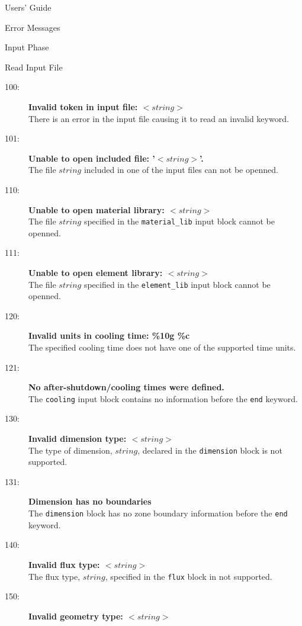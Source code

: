 \begin{chapter}{Users' Guide\label{app:user.guide}}
\begin{section}{Error Messages}
\begin{subsection}{Input Phase}
      \begin{subsubsection}{Read Input File}
        \begin{description}
        \item[100:]\textbf{Invalid token in input file:
            $<\!\!string\!\!>$}\ \\
          There is an error in the input file causing it to read an
          invalid keyword.
        \item[101:]\textbf{Unable to open included file:
            '$<\!\!string\!\!>$'.}\ \\
          The file $string$ included in one of the input files can not
          be openned.
        \item[110:]\textbf{Unable to open material library:
            $<\!\!string\!\!>$}\ \\
          The file $string$ specified in the \texttt{material\_lib} input
          block cannot be openned.
        \item[111:]\textbf{Unable to open element library: $<\!\!string\!\!>$}\ \\
          The file $string$ specified in the \texttt{element\_lib} input
          block cannot be openned.
        \item[120:]\textbf{Invalid units in cooling time: \%10g \%c}\ \\
          The specified cooling time does not have one of the supported
          time units.
        \item[121:]\textbf{No after-shutdown/cooling times were defined.}\
          \\
          The \texttt{cooling} input block contains no information before
          the \texttt{end} keyword.
        \item[130:]\textbf{Invalid dimension type: $<\!\!string\!\!>$}\ \\
          The type of dimension, $string$, declared in the \texttt{dimension} block
          is not supported.
        \item[131:]\textbf{Dimension has no boundaries}\ \\
          The \texttt{dimension} block has no zone boundary information
          before the \texttt{end} keyword.
        \item[140:]\textbf{Invalid flux type: $<\!\!string\!\!>$}\ \\
          The flux type, $string$, specified in the \texttt{flux} block in
          not supported.
        \item[150:]\textbf{Invalid geometry type: $<\!\!string\!\!>$}\ \\

\end{description}
\end{subsubsection}
\end{subsection}
\end{section}
\end{chapter}
